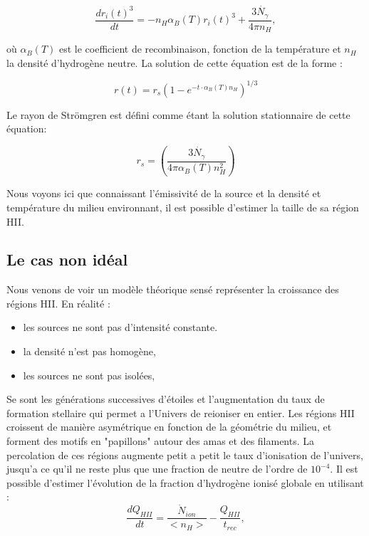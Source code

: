 \begin{equation}
\frac{dr_i(t)^3}{dt} = -n_H \alpha_B(T)r_i (t)^3 + \frac{3 \dot{N_\gamma} }{4 \pi n_H},
\end{equation}

où $\alpha_B(T)$ est le coefficient de recombinaison, fonction de la température et $n_H$ la densité d'hydrogène neutre.
La solution de cette équation est de la forme :

\begin{equation}
r(t) = r_s \left( 1 - e^{-t\cdot \alpha_B(T) n_H } \right)^{1/3}
\end{equation}

%

Le rayon de Strömgren est défini comme étant la solution stationnaire de cette équation:

\begin{equation}
r_s = \left( \frac{3 \dot{N_\gamma} }{4 \pi \alpha_B(T) n_H^2} \right)
\end{equation}

Nous voyons ici que connaissant l'émissivité de la source et la densité et température du milieu environnant, il est possible d'estimer la taille de sa région HII.

\subsection{Le cas non idéal}
Nous venons de voir un modèle théorique sensé représenter la croissance des régions HII.
En réalité : 
\begin{itemize}
\item les sources ne sont pas d'intensité constante. %
\item la densité n'est pas homogène,%
\item les sources ne sont pas isolées,
\end{itemize}


Se sont les générations successives d'étoiles et l'augmentation du taux de formation stellaire qui permet a l'Univers de reioniser en entier.
Les régions HII croissent de manière asymétrique en fonction de la géométrie du milieu, et forment des motifs en "papillons" autour des amas et des filaments.
La percolation de ces régions augmente petit a petit le taux d'ionisation de l'univers, jusqu'a ce qu'il ne reste plus que une fraction de neutre de l'ordre de $10^{-4}$.
Il est possible d'estimer l'évolution de la fraction d'hydrogène ionisé globale en utilisant :
\begin{equation}
\frac{dQ_{HII}}{dt} = \frac{\dot{N}_{ion}}{ <n_H>} - \frac{Q_{HII}}{t_{rec}},
\end{equation}

